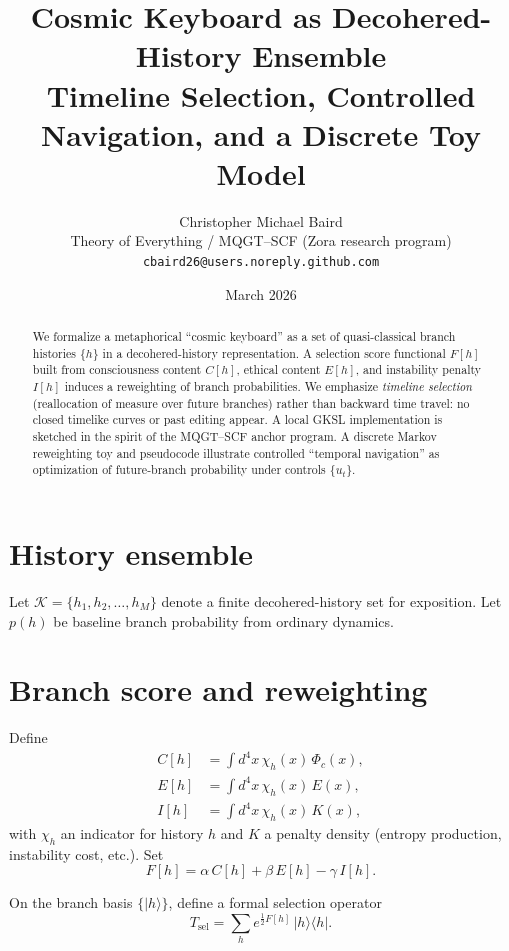 \documentclass[11pt]{article}
\title{Cosmic Keyboard as Decohered-History Ensemble\\
\large Timeline Selection, Controlled Navigation, and a Discrete Toy Model}
\author{Christopher Michael Baird\\
\normalsize Theory of Everything / MQGT--SCF (Zora research program)\\
\normalsize \texttt{cbaird26@users.noreply.github.com}}
\date{March 2026}
\begin{document}
\maketitle

\begin{abstract}
We formalize a metaphorical ``cosmic keyboard'' as a set of quasi-classical branch histories $\{h\}$ in a decohered-history representation. A selection score functional $F[h]$ built from consciousness content $C[h]$, ethical content $E[h]$, and instability penalty $I[h]$ induces a reweighting of branch probabilities. We emphasize \emph{timeline selection} (reallocation of measure over future branches) rather than backward time travel: no closed timelike curves or past editing appear. A local GKSL implementation is sketched in the spirit of the MQGT--SCF anchor program. A discrete Markov reweighting toy and pseudocode illustrate controlled ``temporal navigation'' as optimization of future-branch probability under controls $\{u_t\}$.
\end{abstract}

\section{History ensemble}
Let $\mathcal{K} = \{h_1, h_2, \ldots, h_M\}$ denote a finite decohered-history set for exposition. Let $p(h)$ be baseline branch probability from ordinary dynamics.

\section{Branch score and reweighting}
Define
\begin{align}
C[h] &= \int d^4x \, \chi_h(x) \, \Phi_c(x), \\
E[h] &= \int d^4x \, \chi_h(x) \, E(x), \\
I[h] &= \int d^4x \, \chi_h(x) \, K(x),
\end{align}
with $\chi_h$ an indicator for history $h$ and $K$ a penalty density (entropy production, instability cost, etc.). Set
\begin{equation}
F[h] = \alpha \, C[h] + \beta \, E[h] - \gamma \, I[h].
\end{equation}

On the branch basis $\{ \lvert h \rangle \}$, define a formal selection operator
\begin{equation}
T_{\mathrm{sel}} = \sum_h e^{\frac{1}{2} F[h]} \, \lvert h \rangle \langle h \rvert .
\end{equation}
\end{document}
